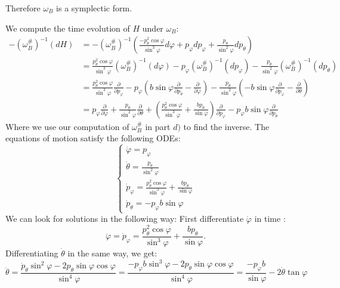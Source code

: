 \documentclass[12pt, a4paper]{article}
\theoremstyle{definition}
\begin{document}
Therefore $\omega_B$ is a symplectic form. 
\item We compute the time evolution of $H$ under $\omega_B$:
\begin{align*}
	- \left( \omega_B^\# \right)^{-1} \left( dH \right) & = - \left( \omega_B^\# \right)^{-1} \left(   \frac{ -p_\theta^2 \cos \varphi }{ \sin^3 \varphi }d\varphi + p_\varphi dp_\varphi + \frac{ p_\theta }{ \sin^2\varphi }dp_\theta \right)
	\\ & = \frac{ p_\theta^2 \cos \varphi }{ \sin^3 \varphi } \left( \omega_B^\# \right)^{-1} \left(d {\varphi} \right)- p_\varphi \left( \omega_B^\# \right)^{-1} \left(d{p_\varphi} \right)- \frac{ p_\theta }{ \sin^2 \varphi } \left( \omega_B^\# \right)^{-1} \left( d{p_\theta} \right)
	\\ & = \frac{ p_\theta^2 \cos \varphi}{ \sin^3 \varphi } \frac{ \partial  }{ \partial p_\varphi } - p_\varphi \left( b \sin \varphi \frac{ \partial  }{ \partial p_\theta } - \frac{ \partial  }{ \partial \varphi } \right) - \frac{ p_\theta }{ \sin^2 \varphi } \left( -b \sin \varphi \frac{ \partial  }{ \partial p_\varphi } - \frac{ \partial  }{ \partial \theta } \right)
	\\ & = p_\varphi\frac{ \partial }{ \partial \varphi } + \frac{ p_\theta }{ \sin^2 \varphi } \frac{ \partial  }{ \partial \theta } + \left( \frac{ p_\theta^2 \cos \varphi }{ \sin^3 \varphi } + \frac{ b p_\theta }{ \sin \varphi }\right) \frac{ \partial  }{ \partial p_\varphi } - p_\varphi b \sin \varphi \frac{ \partial  }{ \partial p_\theta }
\end{align*}
Where we use our computation of $\omega_B^\#$ in part $d)$ to find the inverse. 
The equations of motion satisfy the following ODEs:
$$ \begin{cases}
	\dot{\varphi} = p_\varphi
	\\ \dot{\theta} = \frac{ p_\theta }{ \sin^2 \varphi }
	\\ \dot{p}_\varphi = \frac{ p_\theta^2\cos \varphi }{ \sin^3 \varphi }+ \frac{ bp_\theta }{ \sin \varphi }
	\\ \dot{p}_\theta = -p_\varphi b \sin \varphi
\end{cases}$$ 
We can look for solutions in the following way: 
First differentiate $\dot{\varphi}$ in time :
$$ \ddot{\varphi} = \dot{p}_\varphi = \frac{ p_\theta^2 \cos \varphi }{ \sin^3 \varphi } + \frac{ bp_\theta }{ \sin \varphi }. $$
Differentiating $\dot{\theta}$ in the same way, we get:
$$ \ddot{\theta} = \frac{ \dot{p}_\theta \sin^2 \varphi - 2p_\theta\sin \varphi \cos \varphi }{ \sin^4 \varphi } = \frac{ -p_\varphi b \sin^3 \varphi - 2p_\theta \sin \varphi \cos \varphi }{ \sin^4 \varphi } = \frac{ -p_\varphi b }{ \sin \varphi } - 2 \dot{\theta} \tan \varphi$$ 
\end{document}
